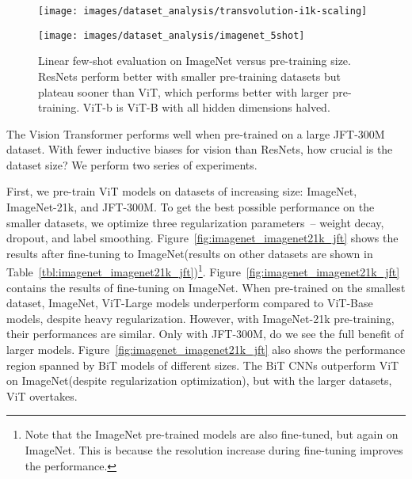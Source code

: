 \documentclass{article} \usepackage{iclr2021_conference,times}
\newcommand{\oursabbrv}{ViT\xspace}
\newcommand{\oursfull}{Vision Transformer\xspace}
\newcommand{\imagenet}{ImageNet\xspace}
\begin{document}
\begin{figure}
    \begin{minipage}[t]{0.47\textwidth}
        \centering
        \texttt{[image: images/dataset\_analysis/transvolution-i1k-scaling]}
        \caption{Transfer to \imagenet. While large \oursabbrv{} models perform worse than BiT ResNets (shaded area) when pre-trained on small datasets, they shine when pre-trained on larger datasets. Similarly, larger \oursabbrv{}  variants overtake smaller ones as the dataset grows.}
        \label{fig:imagenet_imagenet21k_jft}
    \end{minipage}\;\;\;\;
    \begin{minipage}[t]{0.47\textwidth}
        \centering
        \texttt{[image: images/dataset\_analysis/imagenet\_5shot]}
        \caption{Linear few-shot evaluation on ImageNet versus pre-training size. 
        ResNets perform better with smaller pre-training datasets but plateau sooner than \oursabbrv{}, which performs better with larger pre-training. \oursabbrv-b is \oursabbrv-B with all hidden dimensions halved.}
        \label{fig:jft_amount_of_data}
    \end{minipage}
    \vspace{-3mm}
\end{figure}

The \oursfull performs well when pre-trained on a large JFT-300M dataset. 
With fewer inductive biases for vision than ResNets, how crucial is the dataset size?
We perform two series of experiments.

First, we pre-train \oursabbrv{} models on datasets of increasing size: \imagenet, ImageNet-21k, and JFT-300M.
To get the best possible performance on the smaller datasets, we optimize three regularization parameters~-- weight decay, dropout, and label smoothing.
Figure~\ref{fig:imagenet_imagenet21k_jft} shows the results after fine-tuning to \imagenet (results on other datasets are shown in Table~\ref{tbl:imagenet_imagenet21k_jft})\footnote{Note that the \imagenet pre-trained models are also fine-tuned, but again on \imagenet. This is because the resolution increase during fine-tuning improves the performance.}.
Figure~\ref{fig:imagenet_imagenet21k_jft} contains the results of  fine-tuning on \imagenet. 
When pre-trained on  the smallest dataset, \imagenet, \oursabbrv{}-Large models underperform compared to \oursabbrv{}-Base models, despite heavy regularization.
However, with ImageNet-21k pre-training, their  performances are similar.
Only with JFT-300M, do we see the full benefit of larger models.
Figure~\ref{fig:imagenet_imagenet21k_jft} also shows the performance region spanned by BiT models of different sizes.
The BiT CNNs outperform \oursabbrv{} on \imagenet (despite regularization optimization), but with the larger datasets, \oursabbrv{} overtakes.
\end{document}
